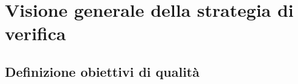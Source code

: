 \section{Visione generale della strategia di verifica}
  \subsection{Definizione obiettivi di qualità}
